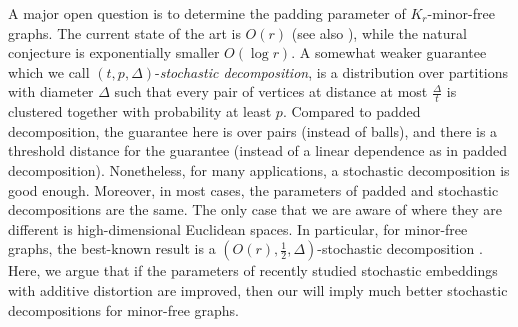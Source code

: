 \documentclass{theoretics}
\begin{document}
A major open question is to determine the padding parameter of $ K_r$-minor-free graphs. The current state of the art is $O(r)$ \cite{AGGNT19} (see also \cite{Fil19Approx}), while the natural conjecture is exponentially smaller  $O(\log r)$. A somewhat weaker guarantee which we call $(t,p,\Delta)$-\emph{stochastic decomposition}, is a distribution over partitions with diameter $\Delta$ such that every pair of vertices at distance at most $\frac{\Delta}{t}$ is clustered together with probability at least $p$. Compared to padded decomposition, the guarantee here is over pairs (instead of balls), and there is a threshold distance for the guarantee (instead of a linear dependence as in padded decomposition). Nonetheless, for many applications, a stochastic decomposition is good enough. Moreover, in most cases, the parameters of padded and stochastic decompositions are the same. The only case that we are aware of where they are different is high-dimensional Euclidean spaces. In particular, for minor-free graphs, the best-known result is a  $(O(r),\frac12,\Delta)$-stochastic decomposition \cite{AGGNT19}. Here, we argue that if the parameters of recently studied stochastic embeddings with additive distortion are improved, then our  will imply much better stochastic decompositions for minor-free graphs.
\end{document}
